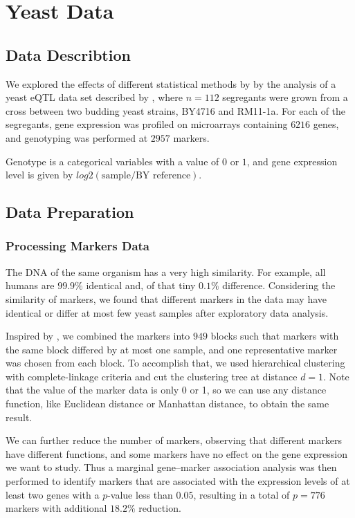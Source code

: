 \section{Yeast Data}\label{sec:data}


\subsection{Data Describtion}

We explored the effects of different statistical methods by by the analysis of a yeast eQTL data set described by \citet{brem2005landscape}, where $n = 112$ segregants were grown from a cross between two budding yeast strains, BY4716 and RM11-1a. 
For each of the segregants, gene expression was profiled on microarrays containing $6216$ genes, and genotyping was performed at $2957$ markers. 

Genotype is a categorical variables with a value of $0$ or $1$, and gene expression level is given by $log2(\text{sample}/\text{BY reference})$. 

\subsection{Data Preparation}

\subsubsection{Processing Markers Data}

The DNA of the same organism has a very high similarity. 
For example, all humans are $99.9\%$ identical and, of that tiny $0.1\%$ difference. 
Considering the similarity of markers, we found that different markers in the data may have identical or differ at most few yeast samples after exploratory data analysis. 

Inspired by \citet{yin2011sparse}, we combined the markers into $949$ blocks such that markers with the same block differed by at most one sample, and one representative marker was chosen from each block. 
To accomplish that, we used hierarchical clustering with complete-linkage criteria and cut the clustering tree at distance $d=1$. 
Note that the value of the marker data is only 0 or 1, so we can use any distance function, like Euclidean distance or Manhattan distance, to obtain the same result.

We can further reduce the number of markers, observing that different markers have different functions, and some markers have no effect on the gene expression we want to study. 
Thus a marginal gene–marker association analysis was then performed to identify markers that are associated with the expression levels of at least two genes with a $p$-value less than $0.05$, resulting in a total of $p = 776$ markers with additional $18.2\%$ reduction. 


